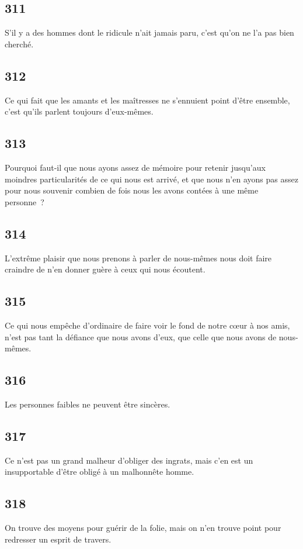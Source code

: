 \documentclass[french,twoside]{book} %
\begin{document}
\subsection[{311}]{ \textsc{311} }
\noindent S’il y a des hommes dont le ridicule n’ait jamais paru, c’est qu’on ne l’a pas bien cherché.
\subsection[{312}]{ \textsc{312} }
\noindent Ce qui fait que les amants et les maîtresses ne s’ennuient point d’être ensemble, c’est qu’ils parlent toujours d’eux-mêmes.
\subsection[{313}]{ \textsc{313} }
\noindent Pourquoi faut-il que nous ayons assez de mémoire pour retenir jusqu’aux moindres particularités de ce qui nous est arrivé, et que nous n’en ayons pas assez pour nous souvenir combien de fois nous les avons contées à une même personne ?
\subsection[{314}]{ \textsc{314} }
\noindent L’extrême plaisir que nous prenons à parler de nous-mêmes nous doit faire craindre de n’en donner guère à ceux qui nous écoutent.
\subsection[{315}]{ \textsc{315} }
\noindent Ce qui nous empêche d’ordinaire de faire voir le fond de notre cœur à nos amis, n’est pas tant la défiance que nous avons d’eux, que celle que nous avons de nous-mêmes.
\subsection[{316}]{ \textsc{316} }
\noindent Les personnes faibles ne peuvent être sincères.
\subsection[{317}]{ \textsc{317} }
\noindent Ce n’est pas un grand malheur d’obliger des ingrats, mais c’en est un insupportable d’être obligé à un malhonnête homme.
\subsection[{318}]{ \textsc{318} }
\noindent On trouve des moyens pour guérir de la folie, mais on n’en trouve point pour redresser un esprit de travers.
\end{document}
